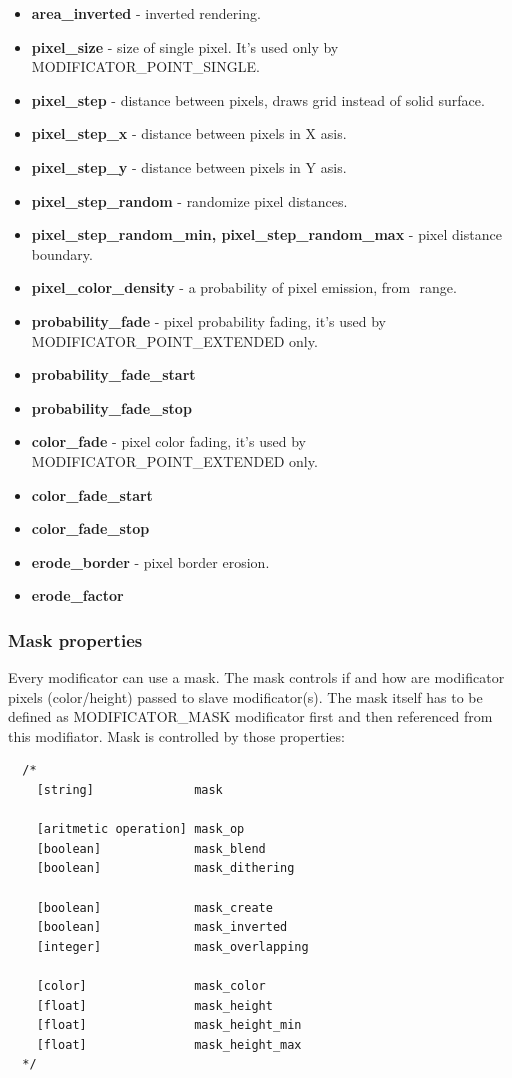 \documentclass[9pt]{article}
\begin{document}
\begin{itemize}
\item{\bf area\_inverted} - inverted rendering.
\item{\bf pixel\_size} - size of single pixel. It's used only by MODIFICATOR\_POINT\_SINGLE.
\item{\bf pixel\_step} - distance between pixels, draws grid instead of solid surface.
\item{\bf pixel\_step\_x} - distance between pixels in X asis.
\item{\bf pixel\_step\_y} - distance between pixels in Y asis.
\item{\bf pixel\_step\_random} - randomize pixel distances.
\item{\bf pixel\_step\_random\_min, pixel\_step\_random\_max} - pixel distance boundary. 
\item{\bf pixel\_color\_density} - a probability of pixel emission, from
\begin{math}<0,1>\end{math} range.
\item{\bf probability\_fade} - pixel probability fading, it's used by MODIFICATOR\_POINT\_EXTENDED only.
\item{\bf probability\_fade\_start}
\item{\bf probability\_fade\_stop}
\item{\bf color\_fade} - pixel color fading, it's used by MODIFICATOR\_POINT\_EXTENDED only.
\item{\bf color\_fade\_start}
\item{\bf color\_fade\_stop}
\item{\bf erode\_border} - pixel border erosion.
\item{\bf erode\_factor}
\end{itemize}

\subsubsection{Mask properties}
\label{mask_properties}

Every modificator can use a mask. The mask controls if and how are
modificator pixels (color/height) passed to slave modificator(s). The mask itself 
has to be defined as MODIFICATOR\_MASK modificator first and then referenced
from this modifiator. Mask is controlled by those properties:

\begin{verbatim}
  /*
    [string]              mask
    
    [aritmetic operation] mask_op
    [boolean]             mask_blend
    [boolean]             mask_dithering
    
    [boolean]             mask_create
    [boolean]             mask_inverted
    [integer]             mask_overlapping
    
    [color]               mask_color
    [float]               mask_height
    [float]               mask_height_min
    [float]               mask_height_max
  */
\end{verbatim}
\end{document}
